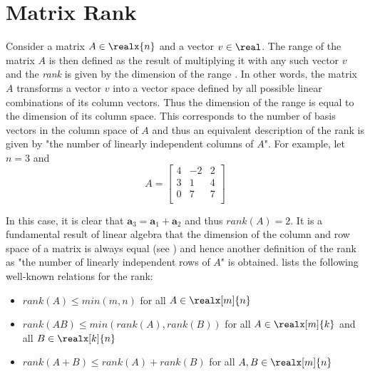 \section{Matrix Rank}
\label{sec:matrix_rank}

Consider a matrix $A \in \realx{n}$ and a vector $v \in \real$. The range of the matrix $A$ is then defined as the result of multiplying it with any such vector $v$ and the \textit{rank} is given by the dimension of the range \cite{bebendorf_hierarchical_2008}. In other words, the matrix $A$ transforms a vector $v$ into a vector space defined by all possible linear combinations of its column vectors. Thus the dimension of the range is equal to the dimension of its column space. This corresponds to the number of basis vectors in the column space of $A$ and thus an equivalent description of the rank is given by "the number of linearly independent columns of $A$". For example, let $n=3$ and
\begin{equation}
\label{eqn:low_rank}
 A= \left[
    \begin{array}{ccc}
      4 & -2 & 2 \\
      3 & 1 & 4  \\
      0 & 7 & 7  \\
    \end{array}
  \right]
\end{equation}

\noindent In this case, it is clear that $\bm{a}_3=\bm{a}_1+\bm{a}_2$ and thus $rank(A)=2$. It is a fundamental result of linear algebra that the dimension of the column and row space of a matrix is always equal (see \cite{strang_introduction_2009}) and hence another definition of the rank as "the number of linearly independent rows of $A$" is obtained. \cite{bebendorf_hierarchical_2008} lists the following well-known relations for the rank:
\begin{itemize}
    \item $rank(A) \leq min(m,n)$ for all $A \in \realx[m]{n}$
    \item $rank(AB) \leq min(rank(A), rank(B))$ for all $A \in \realx[m]{k}$ and all $B \in \realx[k]{n}$
    \item $rank(A+B) \leq rank(A)+rank(B)$ for all $A,B \in \realx[m]{n}$
\end{itemize}

